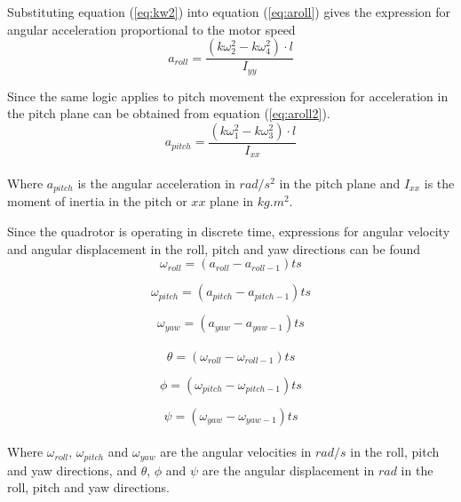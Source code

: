 Substituting equation (\ref{eq:kw2}) into equation (\ref{eq:aroll}) gives the expression for angular acceleration proportional to the motor speed
\begin{equation}
    \label{eq:aroll2}
    a_{roll} = \frac{(k\omega_2^2-k\omega_4^2)\cdot l}{I_{yy}}
\end{equation}\bigskip

Since the same logic applies to pitch movement the expression for acceleration in the pitch plane can be obtained from equation (\ref{eq:aroll2}). 
\begin{equation}
    a_{pitch} = \frac{(k\omega_1^2-k\omega_3^2)\cdot l}{I_{xx}}
\end{equation}
\\
Where $a_{pitch}$ is the angular acceleration in $rad/s^2$ in the pitch plane and $I_{xx}$ is the moment of inertia in the pitch or $xx$ plane in $kg.m^2$. \bigskip

Since the quadrotor is operating in discrete time, expressions for angular velocity and angular displacement in the roll, pitch and yaw directions can be found 
\begin{equation}
    \omega_{roll} = (a_{roll} - a_{roll-1})ts
\end{equation}

\begin{equation}
    \omega_{pitch} = (a_{pitch} - a_{pitch-1})ts
\end{equation}

\begin{equation}
    \omega_{yaw} = (a_{yaw} - a_{yaw-1})ts
\end{equation}
\\
\begin{equation}
    \theta = (\omega_{roll} - \omega_{roll-1})ts
\end{equation}

\begin{equation}
    \phi = (\omega_{pitch} - \omega_{pitch-1})ts
\end{equation}

\begin{equation}
    \psi = (\omega_{yaw} - \omega_{yaw-1})ts
\end{equation}
\\
Where $\omega_{roll}$, $\omega_{pitch}$ and $\omega_{yaw}$ are the angular velocities in $rad/s$ in the roll, pitch and yaw directions, and $\theta$, $\phi$ and $\psi$ are the angular displacement in $rad$ in the roll, pitch and yaw directions.  


